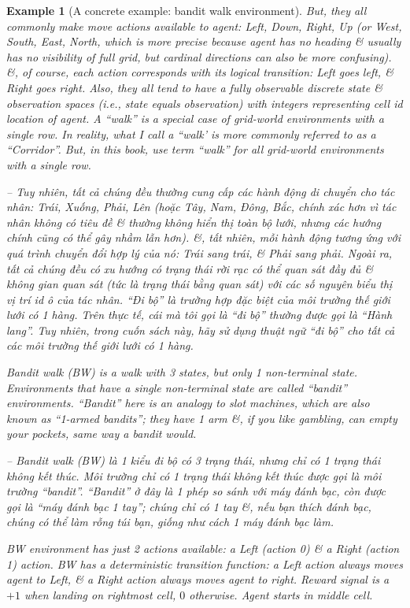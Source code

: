 \documentclass{article}
\newtheorem{example}{Example}
\begin{document}
\begin{itemize}
\begin{itemize}
\begin{itemize}
\begin{example}[A concrete example: bandit walk environment]
                But, they all commonly make move actions available to agent: Left, Down, Right, Up (or West, South, East, North, which is more precise because agent has no heading \& usually has no visibility of full grid, but cardinal directions can also be more confusing). \&, of course, each action corresponds with its logical transition: Left goes left, \& Right goes right. Also, they all tend to have a fully observable discrete state \& observation spaces (i.e., state equals observation) with integers representing cell id location of agent. A ``walk'' is a special case of grid-world environments with a single row. In reality, what I call a ``walk' is more commonly referred to as a ``Corridor''. But, in this book, use term ``walk'' for all grid-world environments with a single row.

                -- Tuy nhiên, tất cả chúng đều thường cung cấp các hành động di chuyển cho tác nhân: Trái, Xuống, Phải, Lên (hoặc Tây, Nam, Đông, Bắc, chính xác hơn vì tác nhân không có tiêu đề \& thường không hiển thị toàn bộ lưới, nhưng các hướng chính cũng có thể gây nhầm lẫn hơn). \&, tất nhiên, mỗi hành động tương ứng với quá trình chuyển đổi hợp lý của nó: Trái sang trái, \& Phải sang phải. Ngoài ra, tất cả chúng đều có xu hướng có trạng thái rời rạc có thể quan sát đầy đủ \& không gian quan sát (tức là trạng thái bằng quan sát) với các số nguyên biểu thị vị trí id ô của tác nhân. ``Đi bộ'' là trường hợp đặc biệt của môi trường thế giới lưới có 1 hàng. Trên thực tế, cái mà tôi gọi là ``đi bộ'' thường được gọi là ``Hành lang''. Tuy nhiên, trong cuốn sách này, hãy sử dụng thuật ngữ ``đi bộ'' cho tất cả các môi trường thế giới lưới có 1 hàng.

                Bandit walk (BW) is a walk with 3 states, but only 1 non-terminal state. Environments that have a single non-terminal state are called ``bandit'' environments. ``Bandit'' here is an analogy to slot machines, which are also known as ``1-armed bandits''; they have 1 arm \&, if you like gambling, can empty your pockets, same way a bandit would.

                -- Bandit walk (BW) là 1 kiểu đi bộ có 3 trạng thái, nhưng chỉ có 1 trạng thái không kết thúc. Môi trường chỉ có 1 trạng thái không kết thúc được gọi là môi trường ``bandit''. ``Bandit'' ở đây là 1 phép so sánh với máy đánh bạc, còn được gọi là ``máy đánh bạc 1 tay''; chúng chỉ có 1 tay \&, nếu bạn thích đánh bạc, chúng có thể làm rỗng túi bạn, giống như cách 1 máy đánh bạc làm.

                BW environment has just 2 actions available: a Left (action 0) \& a Right (action 1) action. BW has a deterministic transition function: a Left action always moves agent to Left, \& a Right action always moves agent to right. Reward signal is a $+1$ when landing on rightmost cell, $0$ otherwise. Agent starts in middle cell.


\end{example}
\end{itemize}
\end{itemize}
\end{itemize}
\end{document}
